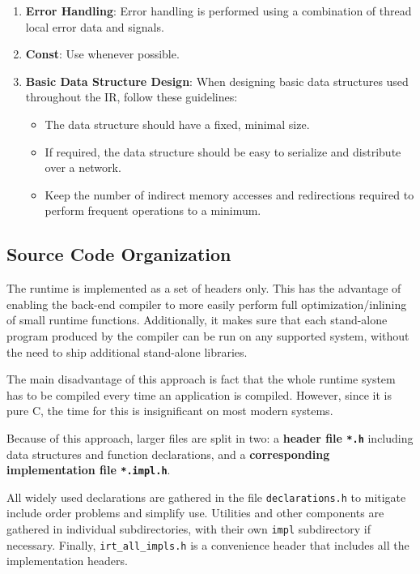 \begin{enumerate}
\item \textbf{Error Handling}:
Error handling is performed using a combination of thread local error data and
signals. 

\item \textbf{Const}:
Use  whenever possible.

\item \textbf{Basic Data Structure Design}:
When designing basic data structures used throughout the IR, follow these
guidelines:
\begin{itemize}
\item The data structure should have a fixed, minimal size.
\item If required, the data structure should be easy to serialize and distribute
  over a network.
\item Keep the number of indirect memory accesses and redirections required to
  perform frequent operations to a minimum.
\end{itemize}
\end{enumerate}

\subsection{Source Code Organization}

The runtime is implemented as a set of headers only. This has the advantage of enabling the back-end compiler to more easily perform full optimization/inlining of small runtime functions. Additionally, it makes sure that each stand-alone program produced by the compiler can be run on any supported system, without the need to ship additional stand-alone libraries.

The main disadvantage of this approach is fact that the whole runtime system has to be compiled every time an application is compiled. However, since it is pure C, the time for this is insignificant on most modern systems.

Because of this approach, larger files are split in two: a \textbf{header file \texttt{*.h}} including data structures and function declarations, and a \textbf{corresponding implementation file \texttt{*.impl.h}}.

All widely used declarations are gathered in the file \texttt{declarations.h} to mitigate include order problems and simplify use. Utilities and other components are gathered in individual subdirectories, with their own \texttt{impl} subdirectory if necessary. Finally, \texttt{irt\_all\_impls.h} is a convenience header that includes all the implementation headers. 

